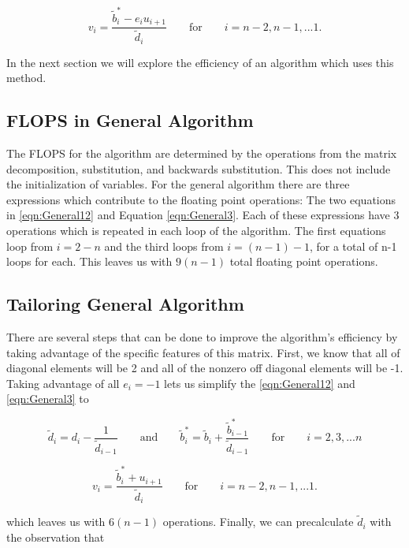 \documentclass[%
oneside,                 %
final,                   %
10pt]{article}
\begin{document}
\begin{equation}\label{eqn:General3}
v_i=\frac{\tilde{b}^*_i - e_i u_{i+1}}{\tilde{d}_i}  \qquad\text{for} \qquad i=n-2,n-1,...1.
\end{equation}

In the next section we will explore the efficiency of an algorithm which uses this method.

\subsection{FLOPS in General Algorithm}

The FLOPS for the algorithm are determined by the operations from the matrix decomposition, substitution, and backwards substitution.  This does not include the initialization of variables.  For the general algorithm there are three expressions which contribute to the floating point operations: The two equations in \ref{eqn:General12} and Equation \ref{eqn:General3}.  Each of these expressions have 3 operations which is repeated in each loop of the algorithm.  The first equations loop from $i=2-n$ and the third loops from $i=(n-1)-1$, for a total of n-1 loops for each.  This leaves us with $9(n-1)$ total floating point operations.

\subsection{Tailoring General Algorithm}

There are several steps that can be done to improve the algorithm's efficiency by taking advantage of the specific features of this matrix.  First, we know that all of diagonal elements will be 2 and all of the nonzero off diagonal elements will be -1.  Taking advantage of all $e_i=-1$ lets us simplify the \ref{eqn:General12} and \ref{eqn:General3} to

\begin{equation} \label{eqn:Specific12}
\tilde{d}_i = d_i - \frac{1}{\tilde{d}_{i-1}}
\qquad \text{and} \qquad
\tilde{b}^*_i = \tilde{b}_i + \frac{ \tilde{b}_{i-1}^*}{\tilde{d}_{i-1}} 
\qquad \text{for} \qquad i=2,3,...n
\end{equation}

\begin{equation}\label{eqn:Specific3}
v_i=\frac{\tilde{b}^*_i + u_{i+1}}{\tilde{d}_i}  \qquad\text{for} \qquad i=n-2,n-1,...1.
\end{equation}

which leaves us with $6(n-1)$ operations.  Finally, we can precalculate $\tilde{d}_i$  with the observation that 
\end{document}
